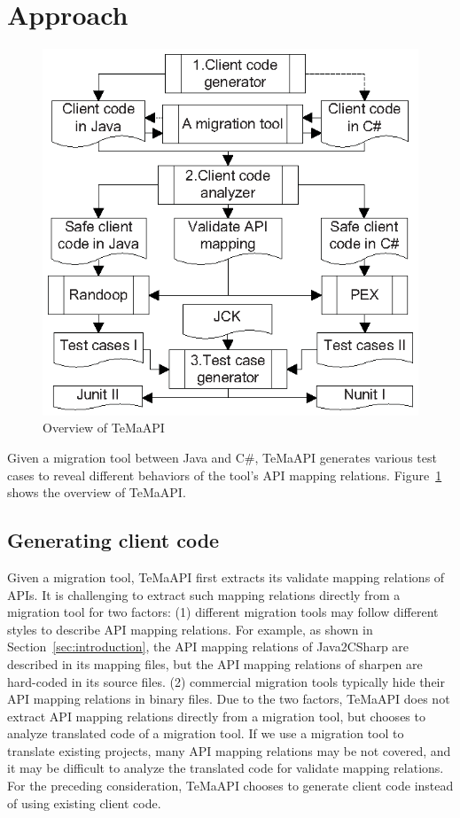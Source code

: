 \section{Approach}
\label{sec:approach}
\begin{figure}[t]
\centering
\includegraphics[scale=1,clip]{figure/approach.eps}\vspace*{-3ex}
 \caption{Overview of TeMaAPI}\vspace*{-4ex}
 \label{fig:approach}
\end{figure}
Given a migration tool between Java and C\#, TeMaAPI generates various test cases to reveal different behaviors of the tool's API mapping relations.
Figure~\ref{fig:approach} shows the overview of TeMaAPI.


\subsection{Generating client code}
\label{sec:approach:generating}
Given a migration tool, TeMaAPI first extracts its validate mapping relations of APIs. It is challenging to extract such mapping relations directly from a migration tool for two factors: (1) different migration tools may follow different styles to describe API mapping relations. For example, as shown in Section~\ref{sec:introduction}, the API mapping relations of Java2CSharp are described in its mapping files, but the API mapping relations of sharpen are hard-coded in its source files. (2) commercial migration tools typically hide their API mapping relations in binary files. Due to the two factors, TeMaAPI does not extract API mapping relations directly from a migration tool, but chooses to analyze translated code of a migration tool. If we use a migration tool to translate existing projects, many API mapping relations may be not covered, and it may be difficult to analyze the translated code for validate mapping relations. For the preceding consideration, TeMaAPI chooses to generate client code instead of using existing client code.

